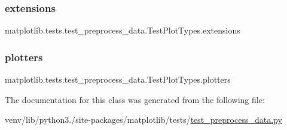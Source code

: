 \subsubsection{\texorpdfstring{extensions}{extensions}}
{\footnotesize\ttfamily matplotlib.\+tests.\+test\+\_\+preprocess\+\_\+data.\+Test\+Plot\+Types.\+extensions\hspace{0.3cm}{\ttfamily [static]}}

\mbox{\label{classmatplotlib_1_1tests_1_1test__preprocess__data_1_1TestPlotTypes_a95ee992505b79e7ee8ef9335edafc02b}} 
\subsubsection{\texorpdfstring{plotters}{plotters}}
{\footnotesize\ttfamily matplotlib.\+tests.\+test\+\_\+preprocess\+\_\+data.\+Test\+Plot\+Types.\+plotters\hspace{0.3cm}{\ttfamily [static]}}



The documentation for this class was generated from the following file\+:\begin{DoxyCompactItemize}
\item 
venv/lib/python3./site-\/packages/matplotlib/tests/\hyperlink{test__preprocess__data_8py}{test\+\_\+preprocess\+\_\+data.\+py}\end{DoxyCompactItemize}
